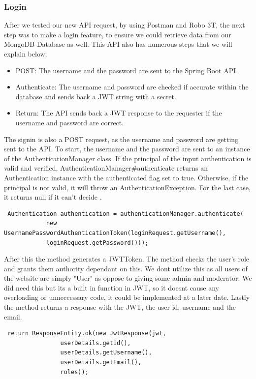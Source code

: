 \subsubsection{Login}
After we tested our new API request, by using Postman and Robo 3T, the next step was to make a login feature, to ensure we could retrieve data from our MongoDB Database as well. This API also has numerous steps that we will explain below: \par
\begin{itemize}
    \item POST: The username and the password are sent to the Spring Boot API.
    \item Authenticate: The username and password are checked if accurate within the database and sends back a JWT string with a secret.
    \item Return: The API sends back a JWT response to the requester if the username and password are correct.
\end{itemize}
The signin is also a POST request, as the username and password are getting sent to the API. To start, the username and the password are sent to an instance of the AuthenticationManager class. If the principal of the input authentication is valid and verified, AuthenticationManager#authenticate returns an Authentication instance with the authenticated flag set to true. Otherwise, if the principal is not valid, it will throw an AuthenticationException. For the last case, it returns null if it can't decide \cite{Baeldung}. \par
\begin{verbatim}
 Authentication authentication = authenticationManager.authenticate(
            new UsernamePasswordAuthenticationToken(loginRequest.getUsername(),
            loginRequest.getPassword())); 
\end{verbatim}
\par After this the method generates a JWTToken. The method checks the user's role and grants them authority dependant on this. We dont utilize this as all users of the website are simply "User" as oppose to giving some admin and moderator. We did need this but its a built in function in JWT, so it doesnt cause any overloading or unneccessary code, it could be implemented at a later date. Lastly the method returns a response with the JWT, the user id, username and the email.\par
\begin{verbatim}
 return ResponseEntity.ok(new JwtResponse(jwt,
                userDetails.getId(),
                userDetails.getUsername(),
                userDetails.getEmail(),
                roles));
\end{verbatim}

